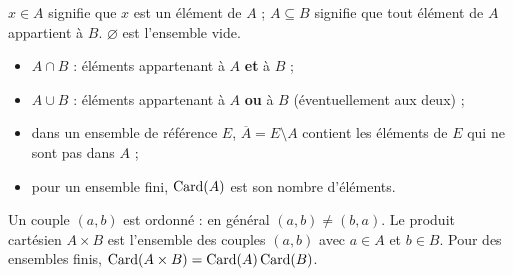 \begin{cours}
$x\in A$ signifie que $x$ est un élément de $A$ ; $A\subseteq B$ signifie que tout élément de $A$ appartient à $B$. $\varnothing$ est l'ensemble vide.
\begin{itemize}
\item $A\cap B$ : éléments appartenant à $A$ \textbf{et} à $B$ ;
\item $A\cup B$ : éléments appartenant à $A$ \textbf{ou} à $B$ (éventuellement aux deux) ;
\item dans un ensemble de référence $E$, $\overline A=E\setminus A$ contient les éléments de $E$ qui ne sont pas dans $A$ ;
\item pour un ensemble fini, $\operatorname{Card}(A)$ est son nombre d'éléments.
\end{itemize}
\end{cours}
\begin{cours}
Un couple $(a,b)$ est ordonné : en général $(a,b)\ne(b,a)$. Le produit cartésien $A\times B$ est l'ensemble des couples $(a,b)$ avec $a\in A$ et $b\in B$. Pour des ensembles finis, $\operatorname{Card}(A\times B)=\operatorname{Card}(A)\operatorname{Card}(B)$.
\end{cours}

